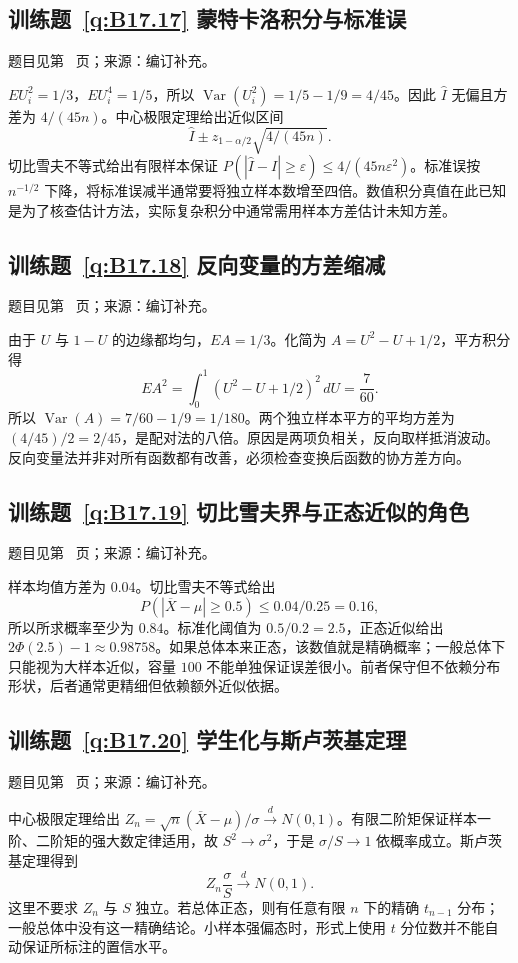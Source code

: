 \documentclass[UTF8,12pt,a4paper,fontset=fandol]{ctexbook}
\begin{document}
\subsection*{训练题~\ref{q:B17.17} 蒙特卡洛积分与标准误}\label{a:B17.17}{\small 题目见第~\pageref{q:B17.17} 页；来源：编订补充。}
\begin{solve}$EU_i^2=1/3$，$EU_i^4=1/5$，所以 $\operatorname{Var}(U_i^2)=1/5-1/9=4/45$。因此 $\widehat I$ 无偏且方差为 $4/(45n)$。中心极限定理给出近似区间\[\widehat I\pm z_{1-\alpha/2}\sqrt{4/(45n)}.\]切比雪夫不等式给出有限样本保证 $P(|\widehat I-I|\ge\varepsilon)\le4/(45n\varepsilon^2)$。标准误按 $n^{-1/2}$ 下降，将标准误减半通常要将独立样本数增至四倍。数值积分真值在此已知是为了核查估计方法，实际复杂积分中通常需用样本方差估计未知方差。\end{solve}

\subsection*{训练题~\ref{q:B17.18} 反向变量的方差缩减}\label{a:B17.18}{\small 题目见第~\pageref{q:B17.18} 页；来源：编订补充。}
\begin{solve}由于 $U$ 与 $1-U$ 的边缘都均匀，$EA=1/3$。化简为 $A=U^2-U+1/2$，平方积分得\[EA^2=\int_0^1(U^2-U+1/2)^2\,dU=\frac7{60}.\]所以 $\operatorname{Var}(A)=7/60-1/9=1/180$。两个独立样本平方的平均方差为 $(4/45)/2=2/45$，是配对法的八倍。原因是两项负相关，反向取样抵消波动。反向变量法并非对所有函数都有改善，必须检查变换后函数的协方差方向。\end{solve}

\subsection*{训练题~\ref{q:B17.19} 切比雪夫界与正态近似的角色}\label{a:B17.19}{\small 题目见第~\pageref{q:B17.19} 页；来源：编订补充。}
\begin{solve}样本均值方差为 $0.04$。切比雪夫不等式给出\[P(|\overline X-\mu|\ge0.5)\le0.04/0.25=0.16,\]所以所求概率至少为 $0.84$。标准化阈值为 $0.5/0.2=2.5$，正态近似给出 $2\Phi(2.5)-1\approx0.98758$。如果总体本来正态，该数值就是精确概率；一般总体下只能视为大样本近似，容量 $100$ 不能单独保证误差很小。前者保守但不依赖分布形状，后者通常更精细但依赖额外近似依据。\end{solve}

\subsection*{训练题~\ref{q:B17.20} 学生化与斯卢茨基定理}\label{a:B17.20}{\small 题目见第~\pageref{q:B17.20} 页；来源：编订补充。}
\begin{solve}中心极限定理给出 $Z_n=\sqrt n(\overline X-\mu)/\sigma\xrightarrow dN(0,1)$。有限二阶矩保证样本一阶、二阶矩的强大数定律适用，故 $S^2\to\sigma^2$，于是 $\sigma/S\to1$ 依概率成立。斯卢茨基定理得到\[Z_n\frac\sigma S\xrightarrow dN(0,1).\]这里不要求 $Z_n$ 与 $S$ 独立。若总体正态，则有任意有限 $n$ 下的精确 $t_{n-1}$ 分布；一般总体中没有这一精确结论。小样本强偏态时，形式上使用 $t$ 分位数并不能自动保证所标注的置信水平。\end{solve}
\end{document}
